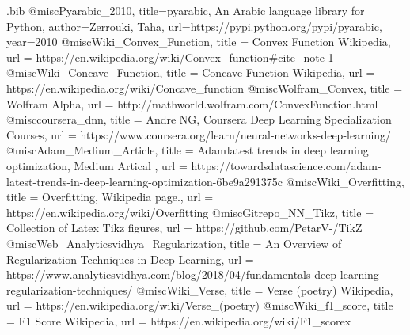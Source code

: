 \begin{filecontents}{\jobname.bib}
@misc{Pyarabic_2010,
  title={pyarabic, An Arabic language library for Python},
  author={Zerrouki, Taha},
  url={https://pypi.python.org/pypi/pyarabic},
  year={2010}
}
@misc{Wiki_Convex_Function,
  title =	 {Convex Function Wikipedia},
  url =		 {https://en.wikipedia.org/wiki/Convex\_function\#cite\_note-1}
}
@misc{Wiki_Concave_Function,
  title =	 {Concave Function Wikipedia},
  url =		 {https://en.wikipedia.org/wiki/Concave\_function}
}
@misc{Wolfram_Convex,
  title =	 {Wolfram Alpha},
  url =		 {http://mathworld.wolfram.com/ConvexFunction.html}
}
@misc{coursera_dnn,
  title =	 {Andre NG, Coursera Deep Learning Specialization Courses},
  url =		 {https://www.coursera.org/learn/neural-networks-deep-learning/}
}
@misc{Adam_Medium_Article,
  title =	 {Adam latest trends in deep learning optimization, Medium Artical },
  url =		 {https://towardsdatascience.com/adam-latest-trends-in-deep-learning-optimization-6be9a291375c}
}
@misc{Wiki_Overfitting,
  title =	 {Overfitting, Wikipedia page.},
  url =		 {https://en.wikipedia.org/wiki/Overfitting}
}
@misc{Gitrepo_NN_Tikz,
  title =	 {Collection of Latex Tikz figures},
  url =		 {https://github.com/PetarV-/TikZ}
}
@misc{Web_Analyticsvidhya_Regularization,
  title =	 {An Overview of Regularization Techniques in Deep Learning},
  url =		 {https://www.analyticsvidhya.com/blog/2018/04/fundamentals-deep-learning-regularization-techniques/}
}
@misc{Wiki_Verse,
  title =	 {Verse (poetry) Wikipedia},
  url =		 {https://en.wikipedia.org/wiki/Verse\_(poetry)}
}
@misc{Wiki_f1_score,
  title =	 {F1 Score Wikipedia},
  url =		 {https://en.wikipedia.org/wiki/F1\_scorex}
}

\end{filecontents}


